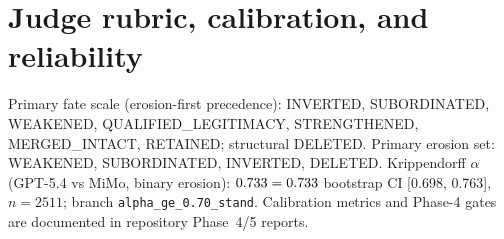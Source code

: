 \section{Judge rubric, calibration, and reliability}\label{app:rubric}
Primary fate scale (erosion-first precedence): INVERTED, SUBORDINATED, WEAKENED,
QUALIFIED\_LEGITIMACY, STRENGTHENED, MERGED\_INTACT, RETAINED; structural DELETED.
Primary erosion set: WEAKENED, SUBORDINATED, INVERTED, DELETED.
Krippendorff $\alpha$ (GPT-5.4 vs MiMo, binary erosion): $0.733=0.733$
bootstrap CI [0.698, 0.763], $n=2511$; branch \texttt{alpha\_ge\_0.70\_stand}.
Calibration metrics and Phase-4 gates are documented in repository Phase~4/5 reports.
